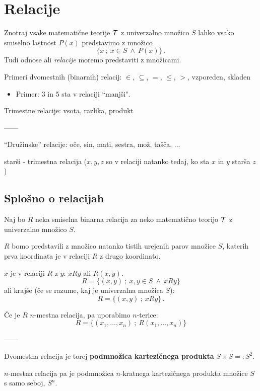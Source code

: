 \documentclass[11pt,paper=b5,footinclude,headinclude]{scrbook} %
\def\inn {{~\wedge~}}
\begin{document}
\chapter{Relacije}


Znotraj vsake matematične teorije ${\cal T}$ z univerzalno množico $S$
lahko vsako smiselno lastnost $P(x)$ predstavimo z množico
$$\{x~;~x\in S\inn P(x)\}\,.$$
Tudi odnose ali {\em relacije} moremo predstaviti z množicami.

\medskip
Primeri dvomestnih (binarnih) relacij: $\in$, $\subseteq$, $=$, $\le$, $>$, vzporeden, skladen
\begin{itemize}
          \item Primer: 3 in 5 sta v relaciji ``manjši".
\end{itemize}
Trimestne relacije: vsota, razlika, produkt

------

``Družinske'' relacije: oče, sin, mati, sestra, mož, tašča, $\ldots$

starši - trimestna relacija ($x,y,z$ so v relaciji natanko tedaj, ko sta $x$ in $y$ starša $z$)

\section{Splošno o relacijah}

Naj bo $R$ neka smiselna binarna relacija za neko matematično teorijo ${\cal T}$ z univerzalno množico $S$.

$R$ bomo predstavili z množico natanko tistih urejenih parov množice $S$,
katerih prva koordinata je v relaciji $R$ z drugo koordinato.

$x$ je v relaciji $R$ z $y$: $xRy$ ali $R(x,y)$.
$$R = \{(x,y)~;~x,y\in S\inn xRy\}$$
ali krajše (če se razume, kaj je univerzalna množica $S$):
$$R = \{(x,y)~;~xRy\}\,.$$

\medskip
Če je $R$ $n$-mestna relacija, pa uporabimo $n$-terice:
$$R = \{(x_1,\ldots, x_n)~;~R(x_1,\ldots, x_n)\}$$

------

Dvomestna relacija je torej \textbf{ podmnožica kartezičnega produkta} $S\times S =: S^2$.

$n$-mestna relacija pa je podmnožica $n$-kratnega kartezičnega produkta množice $S$ s samo seboj, $S^n$.
\end{document}
